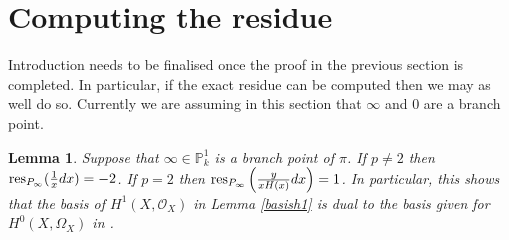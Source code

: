 \documentclass[draft, 11pt]{article} %
\theoremstyle{plain}
\newtheorem{lem}[defn]{Lemma}
\theoremstyle{remark}
\newcommand{\hzero}{{H^0(X,\Omega_X)}}
\newcommand{\hone}{H^1(X,\mathcal{O}_X)}
\begin{document}
\section{Computing the residue}

Introduction needs to be finalised once the proof in the previous section is completed.
In particular, if the exact residue can be computed then we may as well do so.
Currently we are assuming in this section that $\infty$ and 0 are a branch point.

\begin{lem}
Suppose that $\infty\in \mathbb P_k^1$ is a branch point of $\pi$.
If $p \neq 2$ then ${\rm res}_{P_\infty}(\frac{1}{x}dx) = -2$.
If $p=2$ then ${\rm res}_{P_\infty}\left(\frac{y}{xH(x)}dx\right) = 1$.
In particular, this shows that the basis of $\hone$ in Lemma \ref{basish1} is dual to the basis given for $\hzero$ in \cite{faithfulaction}.
\end{lem}
\end{document}
